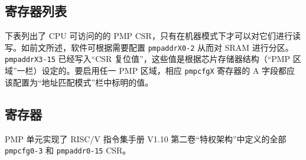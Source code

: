 \documentclass[main\_\_CN.tex]{subfiles}
\begin{document}
\hypertarget{riscvcpu-pmp-reg-summ}{}
\subsection{寄存器列表}
\label{sec:riscvcpu-pmp-reg-summ}


下表列出了 CPU 可访问的的 PMP CSR，只有在机器模式下才可以对它们进行读写。如前文所述，软件可根据需要配置 \texttt{pmpaddrX0-2} 从而对 SRAM 进行分区。\texttt{pmpaddrX3-15} 已经写入“CSR 复位值”，这些值是根据芯片存储器结构（``PMP 区域”一栏）设定的。要启用任一 PMP 区域，相应 \texttt{pmpcfgX} 寄存器的 A 字段都应该配置为“地址匹配模式”栏中标明的值。




\subsection{寄存器}
\label{sec:riscvcpu-pmp-reg-desc}

PMP 单元实现了 RISC\-/V 指令集手册 V1.10 第二卷“特权架构”中定义的全部 \texttt{pmpcfg0-3} 和 \texttt{pmpaddr0-15} CSR。
\end{document}
